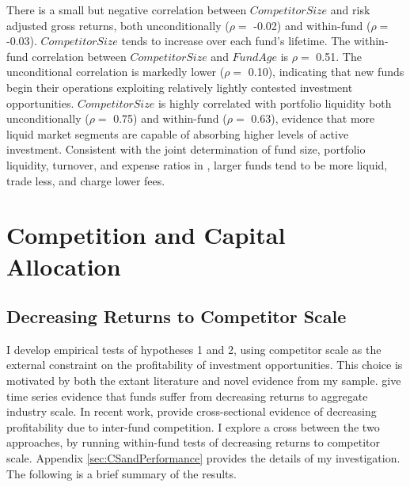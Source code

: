 \documentclass[openany]{book}
\theoremstyle{definition}
\theoremstyle{definition}
\theoremstyle{definition}
\theoremstyle{remark}
\begin{document}
There is a small but negative correlation between \(CompetitorSize\) and
risk adjusted gross returns, both unconditionally (\(\rho=\) -0.02) and
within-fund (\(\rho=\) -0.03). \(CompetitorSize\) tends to increase over
each fund's lifetime. The within-fund correlation between
\(CompetitorSize\) and \(FundAge\) is \(\rho=\) 0.51. The unconditional
correlation is markedly lower (\(\rho=\) 0.10), indicating that new
funds begin their operations exploiting relatively lightly contested
investment opportunities. \(CompetitorSize\) is highly correlated with
portfolio liquidity both unconditionally (\(\rho=\) 0.75) and
within-fund (\(\rho=\) 0.63), evidence that more liquid market segments
are capable of absorbing higher levels of active investment. Consistent
with the joint determination of fund size, portfolio liquidity,
turnover, and expense ratios in \citet{pst17L}, larger funds tend to be
more liquid, trade less, and charge lower fees.

\hypertarget{sec:portfolio}{%
\chapter{Competition and Capital Allocation}\label{sec:portfolio}}

\hypertarget{decreasing-returns-to-competitor-scale}{%
\section{Decreasing Returns to Competitor
Scale}\label{decreasing-returns-to-competitor-scale}}

I develop empirical tests of hypotheses 1 and 2, using competitor scale
as the external constraint on the profitability of investment
opportunities. This choice is motivated by both the extant literature
and novel evidence from my sample. \citet{pst15} give time series
evidence that funds suffer from decreasing returns to aggregate industry
scale. In recent work, \citet{hkp17} provide cross-sectional evidence of
decreasing profitability due to inter-fund competition. I explore a
cross between the two approaches, by running within-fund tests of
decreasing returns to competitor scale. Appendix
\ref{sec:CSandPerformance} provides the details of my investigation. The
following is a brief summary of the results.
\end{document}
